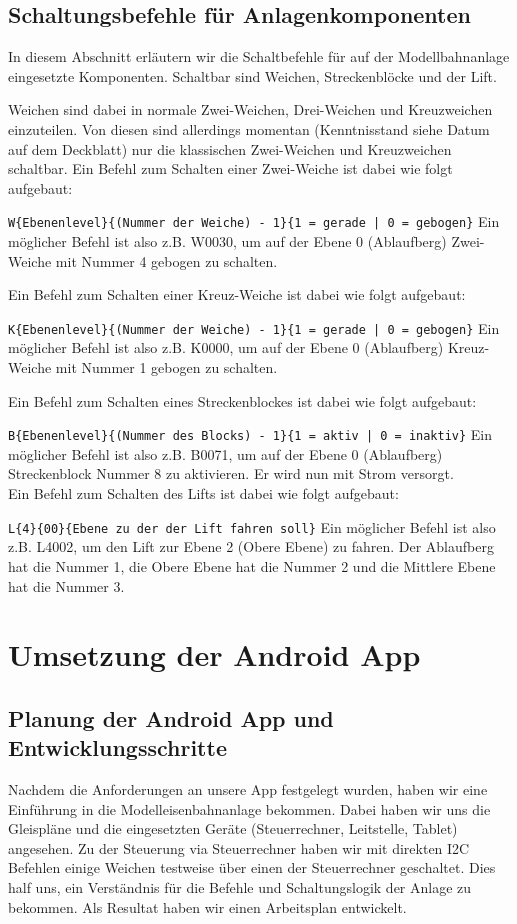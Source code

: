\documentclass{article}
\begin{document}
\subsection{Schaltungsbefehle für Anlagenkomponenten}
In diesem Abschnitt erläutern wir die Schaltbefehle für auf der Modellbahnanlage eingesetzte Komponenten.
Schaltbar sind Weichen, Streckenblöcke und der Lift.

Weichen sind dabei in normale Zwei-Weichen, Drei-Weichen und Kreuzweichen einzuteilen.
Von diesen sind allerdings momentan (Kenntnisstand siehe Datum auf dem Deckblatt) nur die klassischen Zwei-Weichen und Kreuzweichen schaltbar.
Ein Befehl zum Schalten einer Zwei-Weiche ist dabei wie folgt aufgebaut:

\texttt{W\{Ebenenlevel\}\{(Nummer der Weiche) - 1\}\{1 = gerade | 0 = gebogen\}}
Ein möglicher Befehl ist also z.B. W0030, um auf der Ebene 0 (Ablaufberg) Zwei-Weiche mit Nummer 4 gebogen zu schalten.

Ein Befehl zum Schalten einer Kreuz-Weiche ist dabei wie folgt aufgebaut:

\texttt{K\{Ebenenlevel\}\{(Nummer der Weiche) - 1\}\{1 = gerade | 0 = gebogen\}}
Ein möglicher Befehl ist also z.B. K0000, um auf der Ebene 0 (Ablaufberg) Kreuz-Weiche mit Nummer 1 gebogen zu schalten.

Ein Befehl zum Schalten eines Streckenblockes ist dabei wie folgt aufgebaut:

\texttt{B\{Ebenenlevel\}\{(Nummer des Blocks) - 1\}\{1 = aktiv | 0 = inaktiv\}}
Ein möglicher Befehl ist also z.B. B0071, um auf der Ebene 0 (Ablaufberg) Streckenblock Nummer 8 zu aktivieren.
Er wird nun mit Strom versorgt.
\\
Ein Befehl zum Schalten des Lifts ist dabei wie folgt aufgebaut:

\texttt{L\{4\}\{00\}\{Ebene zu der der Lift fahren soll\}}
Ein möglicher Befehl ist also z.B. L4002, um den Lift zur Ebene 2 (Obere Ebene) zu fahren.
Der Ablaufberg hat die Nummer 1, die Obere Ebene hat die Nummer 2 und die Mittlere Ebene hat die Nummer 3.

\section{Umsetzung der Android App}

\subsection{Planung der Android App und Entwicklungsschritte}
Nachdem die Anforderungen an unsere App festgelegt wurden, haben wir eine Einführung in die Modelleisenbahnanlage bekommen.
Dabei haben wir uns die Gleispläne und die eingesetzten Geräte (Steuerrechner, Leitstelle, Tablet) angesehen.
Zu der Steuerung via Steuerrechner haben wir mit direkten I2C Befehlen einige Weichen testweise über einen der Steuerrechner geschaltet.
Dies half uns, ein Verständnis für die Befehle und Schaltungslogik der Anlage zu bekommen.
Als Resultat haben wir einen Arbeitsplan entwickelt.
\end{document}
